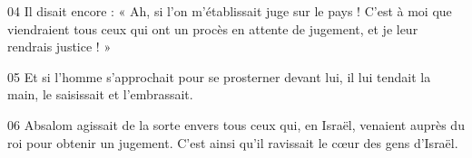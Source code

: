 
04 Il disait encore : « Ah, si l’on m’établissait juge sur le pays ! C’est à moi que viendraient tous ceux qui ont un procès en attente de jugement, et je leur rendrais justice ! »

05 Et si l’homme s’approchait pour se prosterner devant lui, il lui tendait la main, le saisissait et l’embrassait.

06 Absalom agissait de la sorte envers tous ceux qui, en Israël, venaient auprès du roi pour obtenir un jugement. C’est ainsi qu’il ravissait le cœur des gens d’Israël.
